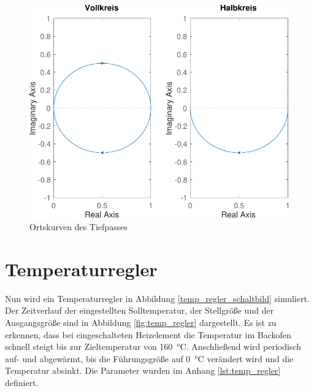 \documentclass[
    paper=a4,
    fontsize=10pt,
    DIV=13,
    oneside,
]{scrartcl}
\begin{document}
    \begin{figure}
        \centering
        \includegraphics[width=\imagewidth]{../versuch1/ortskurve}
        \caption{Ortskurven des Tiefpasses}
        \label{fig:ortskurve}
    \end{figure}

\section{Temperaturregler}
    Nun wird ein Temperaturregler in Abbildung \ref{temp_regler_schaltbild} simuliert. Der Zeitverlauf der eingestellten Solltemperatur, der Stellgröße und der Ausgangsgröße sind in Abbildung \ref{fig:temp_regler} dargestellt. Es ist zu erkennen, dass bei eingeschalteten Heizelement die Temperatur im Backofen schnell steigt bis zur Zieltemperatur von \SI{160}{\celsius}. Anschließend wird periodisch auf- und abgewärmt, bis die Führungsgröße auf \SI{0}{\celsius} verändert wird und die Temperatur absinkt. Die Parameter wurden im Anhang \ref{lst:temp_regler} definiert.
\end{document}
